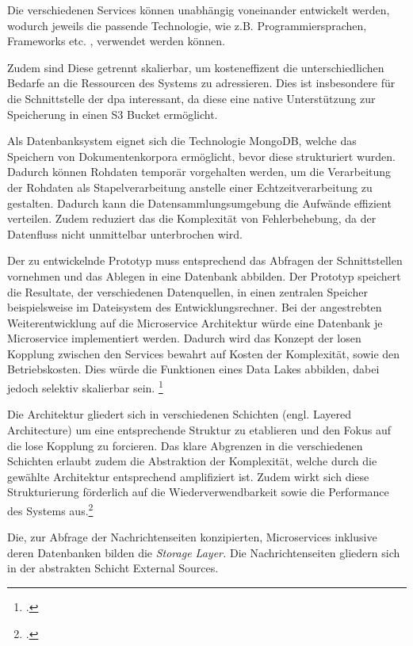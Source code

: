 Die verschiedenen Services können unabhängig voneinander entwickelt werden, wodurch jeweils die passende Technologie, wie z.B. Programmiersprachen, Frameworks etc. , verwendet werden können. 

Zudem sind Diese getrennt skalierbar, um kosteneffizent die unterschiedlichen Bedarfe an die Ressourcen des Systems zu adressieren. Dies ist insbesondere für die Schnittstelle der dpa interessant, da diese eine native Unterstützung zur Speicherung in einen S3 Bucket ermöglicht. 

Als Datenbanksystem eignet sich die Technologie MongoDB, welche das Speichern von Dokumentenkorpora ermöglicht, bevor diese strukturiert wurden. Dadurch können Rohdaten temporär vorgehalten werden, um die Verarbeitung der Rohdaten als Stapelverarbeitung anstelle einer Echtzeitverarbeitung zu gestalten. Dadurch kann die Datensammlungsumgebung die Aufwände effizient verteilen. 
Zudem reduziert das die Komplexität von Fehlerbehebung, da der Datenfluss nicht unmittelbar unterbrochen wird.

Der zu entwickelnde Prototyp muss entsprechend das Abfragen der Schnittstellen vornehmen und das Ablegen in eine Datenbank abbilden. 
Der Prototyp speichert die Resultate, der verschiedenen Datenquellen, in einen zentralen Speicher beispielsweise im Dateisystem des Entwicklungsrechner. 
Bei der angestrebten Weiterentwicklung auf die Microservice Architektur würde eine Datenbank je Microservice implementiert werden. Dadurch wird das Konzept der losen Kopplung zwischen den Services bewahrt auf Kosten der Komplexität, sowie den Betriebskosten. Dies würde die Funktionen eines Data Lakes abbilden, dabei jedoch selektiv skalierbar sein. \footcite[Vgl.][]{Iatropoulou.BigDataServices.2021}{}{}

Die Architektur gliedert sich in verschiedenen Schichten (engl. Layered Architecture) um eine entsprechende Struktur zu etablieren und den Fokus auf die lose Kopplung zu forcieren. Das klare Abgrenzen in die verschiedenen Schichten erlaubt zudem die Abstraktion der Komplexität, welche durch die gewählte Architektur entsprechend amplifiziert ist. Zudem wirkt sich diese Strukturierung förderlich auf die Wiederverwendbarkeit sowie die Performance des Systems aus.\footcite[Vgl.][]{Wang.LayeredMicroservices.2018}{}{}

Die, zur Abfrage der Nachrichtenseiten konzipierten, Microservices inklusive deren Datenbanken bilden die \textit{Storage Layer.} Die Nachrichtenseiten gliedern sich in der abstrakten Schicht External Sources.

